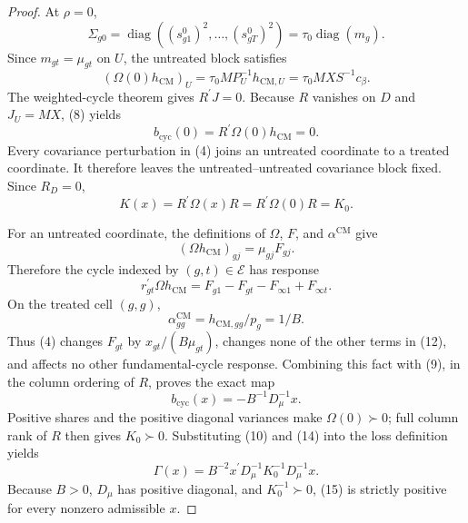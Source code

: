 \documentclass{article}
\begin{document}
\begin{proof}
At \(\rho=0\),
\[
\Sigma_{g0}
=\operatorname{diag}((s^0_{g1})^2,\ldots,(s^0_{gT})^2)
=\tau_0\operatorname{diag}(m_g).                                       \tag{7}
\]
Since \(m_{gt}=\mu_{gt}\) on \(U\), the untreated block satisfies
\[
(\Omega(0)h_{\mathrm{CM}})_U
=\tau_0MP_U^{-1}h_{\mathrm{CM},U}
=\tau_0MX S^{-1}c_\beta.                                                \tag{8}
\]
The weighted-cycle theorem gives \(R^{\prime}J=0\).  Because \(R\) vanishes on \(D\) and \(J_U=MX\), (8) yields
\[
b_{\mathrm{cyc}}(0)=R^{\prime}\Omega(0)h_{\mathrm{CM}}=0.             \tag{9}
\]
Every covariance perturbation in (4) joins an untreated coordinate to a treated coordinate.  It therefore leaves the untreated--untreated covariance block fixed.  Since \(R_D=0\),
\[
K(x)=R^{\prime}\Omega(x)R
=R^{\prime}\Omega(0)R=K_0.                                             \tag{10}
\]

For an untreated coordinate, the definitions of \(\Omega\), \(F\), and \(\alpha^{\mathrm{CM}}\) give
\[
(\Omega h_{\mathrm{CM}})_{gj}=\mu_{gj}F_{gj}.                          \tag{11}
\]
Therefore the cycle indexed by \((g,t)\in\mathcal E\) has response
\[
r_{gt}^{\prime}\Omega h_{\mathrm{CM}}
=F_{g1}-F_{gt}-F_{\infty1}+F_{\infty t}.                               \tag{12}
\]
On the treated cell \((g,g)\),
\[
\alpha^{\mathrm{CM}}_{gg}
=h_{\mathrm{CM},gg}/p_g=1/B.                                           \tag{13}
\]
Thus (4) changes \(F_{gt}\) by \(x_{gt}/(B\mu_{gt})\), changes none of the other terms in (12), and affects no other fundamental-cycle response.  Combining this fact with (9), in the column ordering of \(R\), proves the exact map
\[
b_{\mathrm{cyc}}(x)=-B^{-1}D_\mu^{-1}x.                               \tag{14}
\]
Positive shares and the positive diagonal variances make \(\Omega(0)\succ0\); full column rank of \(R\) then gives \(K_0\succ0\).  Substituting (10) and (14) into the loss definition yields
\[
\Gamma(x)
=B^{-2}x^{\prime}D_\mu^{-1}K_0^{-1}D_\mu^{-1}x.                       \tag{15}
\]
Because \(B>0\), \(D_\mu\) has positive diagonal, and \(K_0^{-1}\succ0\), (15) is strictly positive for every nonzero admissible \(x\).


\end{proof}
\end{document}
